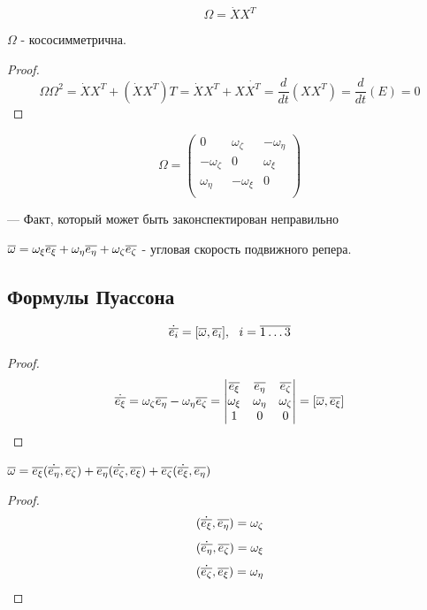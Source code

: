   $$ \Omega = \dot X X^T $$

  
  \begin{ass}
  $\Omega$ - кососимметрична.
  \end{ass}
  \begin{proof}
  $$ \Omega \Omega^2 = \dot X X^T + (\dot X X^T)T = \dot X X^T + X \dot {X^T} = \frac{d}{dt}(XX^T) = 
  \frac{d}{dt}(E) = 0 $$
  \end{proof}
  
  \begin{cor}
  $$ \Omega =
  \left(
  \begin{matrix}
  0 & \omega_{\zeta} & -\omega_{\eta} \\
  -\omega_{\zeta} & 0 & \omega_{\xi} \\
  \omega_{\eta} & -\omega_{\xi} & 0 \\
  \end{matrix}
  \right)
  $$
  \end{cor}
  --- Факт, который может быть законспектирован неправильно
  \begin{df}
  $ {\overline{\omega}} = \omega_{\xi}{\overline{e_{\xi}}} + \omega_{\eta}{\overline{e_{\eta}}} + \omega_{\zeta}{\overline{e_{\zeta}}} $ - угловая скорость подвижного репера.
  \end{df}
  
  \subsection{Формулы Пуассона}
  \begin{ass}
  $$ \dot{{\overline{e_i}}} = [{\overline{\omega}}, {\overline{e_i}}],~~ i = \overline{1 \ldots 3} $$
  \end{ass}
  \begin{proof}
  $$
  \dot{{\overline{e_{\xi}}}} = \omega_{\zeta} {\overline{e_{\eta}}} - \omega_{\eta} {\overline{e_{\zeta}}} =
  \begin{vmatrix}
  {\overline{e_{\xi}}} & {\overline{e_{\eta}}} & {\overline{e_{\zeta}}} \\
  \omega_{\xi} & \omega_{\eta} & \omega_{\zeta} \\
  1 & 0 & 0 \\ 
  \end{vmatrix}
  =
  [{\overline{\omega}}, {\overline{e_{\xi}}}] 
  $$
  \end{proof}
  
  \begin{ass}
  $ {\overline{\omega}} = {\overline{e_{\xi}}}(\dot{{\overline{e_{\eta}}}}, {\overline{e_{\zeta}}}) + {\overline{e_{\eta}}}(\dot{{\overline{e_{\zeta}}}}, {\overline{e_{\xi}}}) + {\overline{e_{\zeta}}}(\dot{{\overline{e_{\xi}}}}, {\overline{e_{\eta}}}) $
  \end{ass}
  \begin{proof}
  $$ (\dot{{\overline{e_{\xi}}}}, {\overline{e_{\eta}}}) = \omega_{\zeta} $$
  $$ (\dot{{\overline{e_{\eta}}}}, {\overline{e_{\zeta}}}) = \omega_{\xi} $$
  $$ (\dot{{\overline{e_{\zeta}}}}, {\overline{e_{\xi}}}) = \omega_{\eta} $$
  \end{proof}
  
